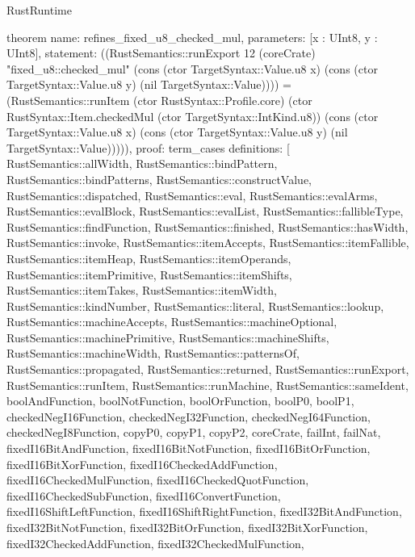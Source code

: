 \begin{lexlean}{RustRuntime}
\begin{semanticmodule}
theorem{
  name: refines_fixed_u8_checked_mul,
  parameters: [x : UInt8, y : UInt8],
  statement: ((RustSemantics::runExport 12 (coreCrate) "fixed_u8::checked_mul" (cons (ctor TargetSyntax::Value.u8 x) (cons (ctor TargetSyntax::Value.u8 y) (nil TargetSyntax::Value)))) = (RustSemantics::runItem (ctor RustSyntax::Profile.core) (ctor RustSyntax::Item.checkedMul (ctor TargetSyntax::IntKind.u8)) (cons (ctor TargetSyntax::Value.u8 x) (cons (ctor TargetSyntax::Value.u8 y) (nil TargetSyntax::Value))))),
  proof: term_cases{
    definitions: [
      RustSemantics::allWidth,
      RustSemantics::bindPattern,
      RustSemantics::bindPatterns,
      RustSemantics::constructValue,
      RustSemantics::dispatched,
      RustSemantics::eval,
      RustSemantics::evalArms,
      RustSemantics::evalBlock,
      RustSemantics::evalList,
      RustSemantics::fallibleType,
      RustSemantics::findFunction,
      RustSemantics::finished,
      RustSemantics::hasWidth,
      RustSemantics::invoke,
      RustSemantics::itemAccepts,
      RustSemantics::itemFallible,
      RustSemantics::itemHeap,
      RustSemantics::itemOperands,
      RustSemantics::itemPrimitive,
      RustSemantics::itemShifts,
      RustSemantics::itemTakes,
      RustSemantics::itemWidth,
      RustSemantics::kindNumber,
      RustSemantics::literal,
      RustSemantics::lookup,
      RustSemantics::machineAccepts,
      RustSemantics::machineOptional,
      RustSemantics::machinePrimitive,
      RustSemantics::machineShifts,
      RustSemantics::machineWidth,
      RustSemantics::patternsOf,
      RustSemantics::propagated,
      RustSemantics::returned,
      RustSemantics::runExport,
      RustSemantics::runItem,
      RustSemantics::runMachine,
      RustSemantics::sameIdent,
      boolAndFunction,
      boolNotFunction,
      boolOrFunction,
      boolP0,
      boolP1,
      checkedNegI16Function,
      checkedNegI32Function,
      checkedNegI64Function,
      checkedNegI8Function,
      copyP0,
      copyP1,
      copyP2,
      coreCrate,
      failInt,
      failNat,
      fixedI16BitAndFunction,
      fixedI16BitNotFunction,
      fixedI16BitOrFunction,
      fixedI16BitXorFunction,
      fixedI16CheckedAddFunction,
      fixedI16CheckedMulFunction,
      fixedI16CheckedQuotFunction,
      fixedI16CheckedSubFunction,
      fixedI16ConvertFunction,
      fixedI16ShiftLeftFunction,
      fixedI16ShiftRightFunction,
      fixedI32BitAndFunction,
      fixedI32BitNotFunction,
      fixedI32BitOrFunction,
      fixedI32BitXorFunction,
      fixedI32CheckedAddFunction,
      fixedI32CheckedMulFunction,
}}
\end{semanticmodule}
\end{lexlean}
